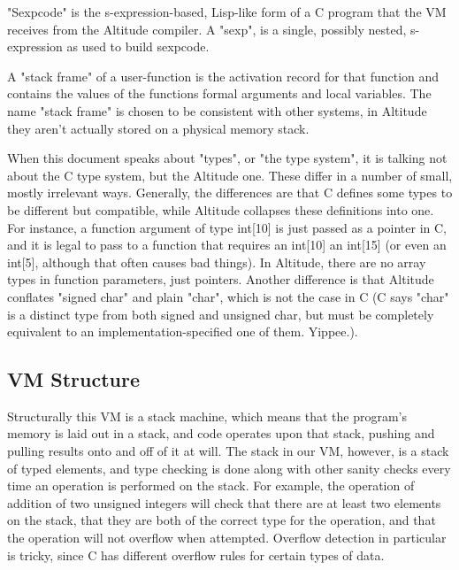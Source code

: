 \documentclass[10pt,a4paper]{report}
\begin{document}
"Sexpcode" is the s-expression-based, Lisp-like form of a C program that the VM receives from the Altitude compiler. A "sexp", is a single, possibly nested, s-expression as used to build sexpcode.

A "stack frame" of a user-function is the activation record for that function and contains the values of the functions formal arguments and local variables. The name "stack frame" is chosen to be consistent with other systems, in Altitude they aren't actually stored on a physical memory stack.

When this document speaks about "types", or "the type system", it is talking not about the C type system, but the Altitude one. These differ in a number of small, mostly irrelevant ways. Generally, the differences are that C defines some types to be different but compatible, while Altitude collapses these definitions into one. For instance, a function argument of type int[10] is just passed as a pointer in C, and it is legal to pass to a function that requires an int[10] an int[15] (or even an int[5], although that often causes bad things). In Altitude, there are no array types in function parameters, just pointers. Another difference is that Altitude conflates "signed char" and plain "char", which is not the case in C (C says "char" is a distinct type from both signed and unsigned char, but must be completely equivalent to an implementation-specified one of them. Yippee.).


\subsection{VM Structure}
Structurally this VM is a stack machine, which means that the program's memory is laid out in a stack, and code operates upon that stack, pushing and pulling results onto and off of it at will. The stack in our VM, however, is a stack of typed elements, and type checking is done along with other sanity checks every time an operation is performed on the stack. For example, the operation of addition of two unsigned integers will check that there are at least two elements on the stack, that they are both of the correct type for the operation, and that the operation will not overflow when attempted. Overflow detection in particular is tricky, since C has different overflow rules for certain types of data.
\end{document}
